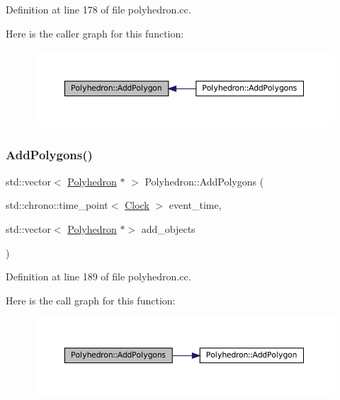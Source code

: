 Definition at line 178 of file polyhedron.\+cc.

Here is the caller graph for this function\+:\nopagebreak
\begin{figure}[H]
\begin{center}
\leavevmode
\includegraphics[width=350pt]{class_polyhedron_a63bc509a87935cc25e541d2490c01d1f_icgraph}
\end{center}
\end{figure}
\mbox{\label{class_polyhedron_a9564a286e7323b56667971b851f0674a}} 
\subsubsection{\texorpdfstring{Add\+Polygons()}{AddPolygons()}}
{\footnotesize\ttfamily std\+::vector$<$ \mbox{\hyperlink{class_polyhedron}{Polyhedron}} $\ast$ $>$ Polyhedron\+::\+Add\+Polygons (\begin{DoxyParamCaption}\item[{std\+::chrono\+::time\+\_\+point$<$ \mbox{\hyperlink{universe_8h_a0ef8d951d1ca5ab3cfaf7ab4c7a6fd80}{Clock}} $>$}]{event\+\_\+time,  }\item[{std\+::vector$<$ \mbox{\hyperlink{class_polyhedron}{Polyhedron}} $\ast$$>$}]{add\+\_\+objects }\end{DoxyParamCaption})}



Definition at line 189 of file polyhedron.\+cc.

Here is the call graph for this function\+:\nopagebreak
\begin{figure}[H]
\begin{center}
\leavevmode
\includegraphics[width=350pt]{class_polyhedron_a9564a286e7323b56667971b851f0674a_cgraph}
\end{center}
\end{figure}
\mbox{\label{class_polyhedron_abfacad3a348785dab8819e70bf92d8d1}} 
